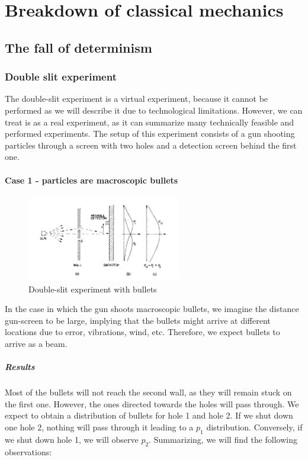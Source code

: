 \graphicspath{{chapters/02/}}
\chapter{Breakdown of classical mechanics}

\section{The fall of determinism}

  \subsection{Double slit experiment}
  The double-slit experiment is a virtual experiment, because it cannot be performed as we will describe it due to technological limitations.
  However, we can treat is as a real experiment, as it can summarize many technically feasible and performed experiments.
  The setup of this experiment consists of a gun shooting particles through a screen with two holes and a detection screen behind the first one.

  \subsubsection{Case 1 - particles are macroscopic bullets}

  \begin{figure}[h!]
    \centering
    \includegraphics[clip, width=0.6\textwidth]{gun_ds.png}
    \caption{\label{fig:gun_ds} Double-slit experiment with bullets}
  \end{figure}

  In the case in which the gun shoots macroscopic bullets, we imagine the distance gun-screen to be large, implying that the bullets might arrive at different locations due to error, vibrations, wind, etc.
  Therefore, we expect bullets to arrive as a beam.

    \paragraph{Results}
    Most of the bullets will not reach the second wall, as they will remain stuck on the first one.
    However, the ones directed towards the holes will pass through.
    We expect to obtain a distribution of bullets for hole 1 and hole 2.
    If we shut down one hole 2, nothing will pass through it leading to a $p_1$ distribution.
    Conversely, if we shut down hole 1, we will observe $p_2$.
    Summarizing, we will find the following observations:

